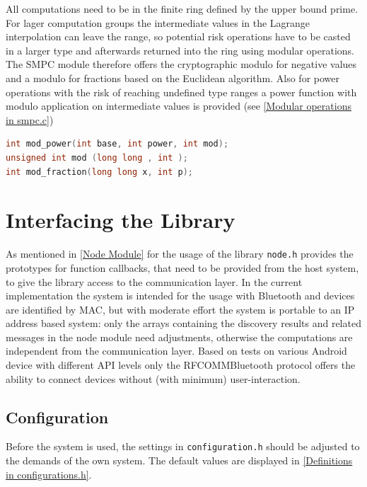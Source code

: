 All computations need to be in the finite ring defined by the upper bound prime. For lager computation groups the intermediate values in the Lagrange interpolation can leave the range, so potential risk operations have to be casted in a larger type and afterwards returned into the ring using modular operations. The \gls{SMPC} module therefore offers the cryptographic modulo for negative values and a modulo for fractions based on the Euclidean algorithm. Also for power operations with the risk of reaching undefined type ranges a power function with modulo application on intermediate values is provided (see \autoref{Modular operations in smpc.c})

\begin{lstlisting}[language=C, caption={Modular operations in smpc.c}, label={Modular operations in smpc.c}, float, floatplacement=H]
int mod_power(int base, int power, int mod);
unsigned int mod (long long , int );
int mod_fraction(long long x, int p);
\end{lstlisting}

\section{Interfacing the Library} \label{Interfacing the Library}

As mentioned in \autoref{Node Module} for the usage of the library \lstinline|node.h| provides the prototypes for function callbacks, that need to be provided from the host system, to give the library access to the communication layer. In the current implementation the system is intended for the usage with Bluetooth and devices are identified by \gls{MAC}, but with moderate effort the system is portable to an IP address based system: only the arrays containing the discovery results and related messages in the node module need adjustments, otherwise the computations are independent from the communication layer.
Based on tests on various Android device with different \gls{API} levels only the \gls{RFCOMM}Bluetooth protocol offers the ability to connect devices without (with minimum) user-interaction.

\subsection{Configuration} \label{Configuration}

Before the system is used, the settings in \lstinline|configuration.h| should be adjusted to the demands of the own system. The default values are displayed in \autoref{Definitions in configurations.h}.

